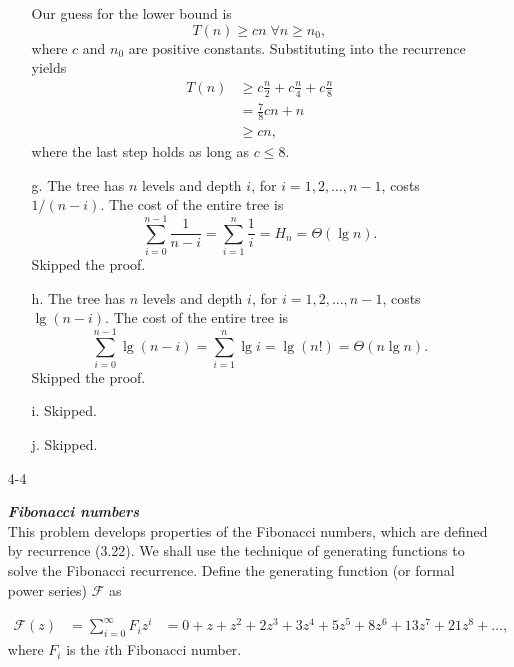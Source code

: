 \documentclass{report}
\makeatletter
\renewenvironment{framed}{%
 \def\FrameCommand##1{\hskip\@totalleftmargin
 \fboxsep=\FrameSep\fbox{##1}}%
 \MakeFramed {\advance\hsize-\width
   \@totalleftmargin\z@ \linewidth\hsize
   \@setminipage}}%
 {\par\unskip\endMakeFramed}
\DeclareMathOperator{\Forall}{\forall}
\makeatother
\begin{document}
\begin{enumerate}
\begin{framed}
\begin{enumerate}
      Our guess for the lower bound is
      \[
      T(n) \ge c n \; \Forall n \ge n_0,
      \]
      where $c$ and $n_0$ are positive constants. Substituting into the recurrence
      yields
      \begin{equation*}
      \begin{aligned}
        T(n) &\ge c \frac{n}{2} + c \frac{n}{4} + c \frac{n}{8}\\
             &= \frac{7}{8} cn + n\\
             &\ge cn,
      \end{aligned}
      \end{equation*}
      where the last step holds as long as $c \le 8$.
    \item[g.] The tree has $n$ levels and depth $i$, for
      $i = 1, 2, \dots, n - 1$, costs $1/(n - i)$. The cost of the entire tree
      is
      \[
        \sum_{i = 0}^{n - 1} \frac{1}{n - i} = \sum_{i = 1}^{n} \frac{1}{i} = H_n = \Theta(\lg n).
      \]
      Skipped the proof.
    \item[h.] The tree has $n$ levels and depth $i$, for
      $i = 1, 2, \dots, n - 1$, costs $\lg(n - i)$. The cost of the entire tree
      is
      \[
        \sum_{i = 0}^{n - 1} \lg(n - i) = \sum_{i = 1}^{n} \lg i = \lg(n!) = \Theta(n \lg n).
      \]
      Skipped the proof.
    \item[i.] Skipped.
    \item[j.] Skipped.
  \end{enumerate}
\end{framed}

\newpage

\item[4{-}4]{\textbf{\emph{Fibonacci numbers}}\\
This problem develops properties of the Fibonacci numbers, which are defined by
recurrence (3.22). We shall use the technique of generating functions to solve
the Fibonacci recurrence. Define the generating function (or formal power
series) $\mathcal{F}$ as

\begin{equation*}
\begin{aligned}
  \mathcal{F}(z) &= \sum_{i = 0}^\infty F_i z^i
                 &= 0 + z + z^2 + 2z^3 + 3z^4 + 5z^5 + 8z^6 + 13z^7 + 21z^8 + \dots,
\end{aligned}
\end{equation*}
where $F_i$ is the $i$th Fibonacci number.

}
\end{enumerate}
\end{document}
